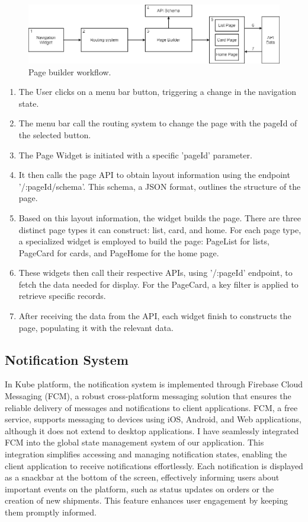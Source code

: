 \begin{figure}
    \centering
    \includegraphics[scale=0.47]{Pictures/5_page_builder.png}
    \caption{Page builder workflow.}
    \label{fig:5_page_builder}
\end{figure}

\begin{enumerate}
    \item The User clicks on a menu bar button, triggering a change in the navigation state.
    \item The menu bar call the routing system to change the page with the pageId of the selected
          button.
    \item The Page Widget is initiated with a specific 'pageId' parameter.
    \item It then calls the page API to obtain layout information using the endpoint
          '/:pageId/schema'. This schema, a JSON format, outlines the structure of the page.
    \item Based on this layout information, the widget builds the page. There are three distinct
          page types it can construct: list, card, and home. For each page type, a specialized
          widget is employed to build the page: PageList for lists, PageCard for cards, and PageHome
          for the home page.
    \item These widgets then call their respective APIs, using '/:pageId' endpoint, to fetch the
          data needed for display. For the PageCard, a key filter is applied to retrieve specific records.
    \item After receiving the data from the API, each widget finish to constructs the page,
          populating it with the relevant data.
\end{enumerate}


\subsection{Notification System}
In Kube platform, the notification system is implemented through Firebase Cloud Messaging (FCM), a
robust cross-platform messaging solution that ensures the reliable delivery of messages and
notifications to client applications. FCM, a free service, supports messaging to devices using iOS,
Android, and Web applications, although it does not extend to desktop applications. I have
seamlessly integrated FCM into the global state management system of our application. This
integration simplifies accessing and managing notification states, enabling the client application
to receive notifications effortlessly. Each notification is displayed as a snackbar at the bottom of
the screen, effectively informing users about important events on the platform, such as status
updates on orders or the creation of new shipments. This feature enhances user engagement by keeping
them promptly informed.

